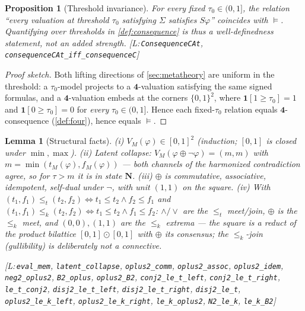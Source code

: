 \documentclass[11pt,a4paper]{article}
\newtheorem{lemma}[theorem]{Lemma}
\newtheorem{proposition}[theorem]{Proposition}
\theoremstyle{definition}
\newcommand{\FOUR}{\mathbf{4}}
\newcommand{\vN}{\mathbf{N}}
\newcommand{\hmz}{\oplus}                       %
\newcommand{\lek}{\le_{k}}
\newcommand{\tle}{\le_{t}}
\newcommand{\ind}[1]{\mathbf{1}[#1]}            %
\newcommand{\lean}[1]{\texttt{#1}}
\newenvironment{leanrefs}
  {\par\smallskip\noindent\begin{minipage}{\linewidth}\small\raggedright}
  {\end{minipage}\par\smallskip}
\begin{document}
\begin{proposition}[Threshold invariance]\label{prop:tau}
For every fixed $\tau_0\in(0,1]$, the relation ``every valuation at
threshold $\tau_0$ satisfying $\Sigma$ satisfies $S\varphi$'' coincides with
$\models$. Quantifying over thresholds in \cref{def:consequence} is thus a
well-definedness statement, not an added strength.
[L:\,\lean{ConsequenceCAt}, \lean{consequenceCAt\_iff\_consequenceC}]
\end{proposition}
\begin{proof}[Proof sketch]
Both lifting directions of \cref{sec:metatheory} are uniform in the
threshold: a $\tau_0$-model projects to a $\FOUR$-valuation satisfying the
same signed formulas, and a $\FOUR$-valuation embeds at the corners
$\{0,1\}^2$, where $\ind{1\ge\tau_0}=1$ and $\ind{0\ge\tau_0}=0$ for
\emph{every} $\tau_0\in(0,1]$. Hence each fixed-$\tau_0$ relation equals
$\FOUR$-consequence (\cref{def:four}), hence equals $\models$.
\end{proof}

\begin{lemma}[Structural facts]\label{lem:structure}
(i) $V_M(\varphi)\in[0,1]^2$ (induction; $[0,1]$ is closed under
$\min,\max$). (ii) \emph{Latent collapse}:
$V_M(\varphi\hmz\lnot\varphi)=(m,m)$ with
$m=\min(t_M(\varphi),f_M(\varphi))$ --- both channels of the harmonized
contradiction agree, so for $\tau>m$ it is in state $\vN$. (iii) $\hmz$ is
commutative, associative, idempotent, self-dual under $\lnot$, with unit
$(1,1)$ on the square. (iv) With
$(t_1,f_1)\tle(t_2,f_2)\iff t_1\le t_2 \wedge f_2\le f_1$ and
$(t_1,f_1)\lek(t_2,f_2)\iff t_1\le t_2\wedge f_1\le f_2$: $\wedge/\vee$ are
the $\tle$ meet/join, $\hmz$ is the $\lek$ meet, and $(0,0),(1,1)$ are the
$\lek$ extrema --- the square is a reduct of the product bilattice
$[0,1]\odot[0,1]$ \cite{ginsberg1988multivalued} with $\hmz$ its consensus;
the $\lek$-join (gullibility) is deliberately not a connective.
\begin{leanrefs}
[L:\,\lean{eval\_mem}, \lean{latent\_collapse},
\lean{oplus2\_comm}, \lean{oplus2\_assoc}, \lean{oplus2\_idem},
\lean{neg2\_oplus2}, \lean{B2\_oplus}, \lean{oplus2\_B2},\newline
\lean{conj2\_le\_t\_left}, \lean{conj2\_le\_t\_right},
\lean{le\_t\_conj2}, \lean{disj2\_le\_t\_left},
\lean{disj2\_le\_t\_right}, \lean{disj2\_le\_t},\newline
\lean{oplus2\_le\_k\_left}, \lean{oplus2\_le\_k\_right},
\lean{le\_k\_oplus2}, \lean{N2\_le\_k}, \lean{le\_k\_B2}]
\end{leanrefs}
\end{lemma}
\end{document}
